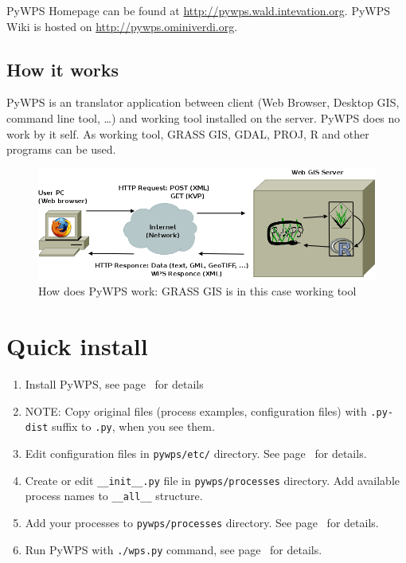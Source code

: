 \documentclass[a4paper,11pt]{article}
\newcommand{\pywpssite}{\url{http://pywps.wald.intevation.org}}
\newcommand{\pywpswiki}{\url{http://pywps.ominiverdi.org}}
\begin{document}
PyWPS Homepage can be found at \pywpssite.
PyWPS Wiki is hosted on \pywpswiki. 

\subsection{How it works}
PyWPS is an translator application between client (Web Browser, Desktop
GIS, command line tool, \dots) and working tool installed on the server.
PyWPS does no work by it self. As working tool, GRASS GIS, GDAL, PROJ, R
and other programs can be used.

\begin{figure}[ht]
\begin{center}
\includegraphics[width=1\textwidth]{pic/pywps-schema}
\caption{How does PyWPS work: GRASS GIS is in this case working tool}
\label{pic:pywps}
\end{center}
\end{figure}

\section{Quick install}
\begin{enumerate}
    \item Install PyWPS, see page~\pageref{install} for details
    \item NOTE: Copy original files (process examples, configuration files)
    with \texttt{.py-dist} suffix to \texttt{.py}, when you see them.
    \item Edit configuration files in \texttt{pywps/etc/} directory. See
    page~\pageref{configuration} for details.
    \item Create or edit \texttt{\_\_init\_\_.py} file in
    \texttt{pywps/processes} directory. Add available process names to
    \texttt{\_\_all\_\_} structure.
    \item Add your processes to \texttt{pywps/processes} directory. See
    page~\pageref{processes} for details.
    \item Run PyWPS with \texttt{./wps.py} command, see
    page~\pageref{testing} for details.
\end{enumerate}
\end{document}
